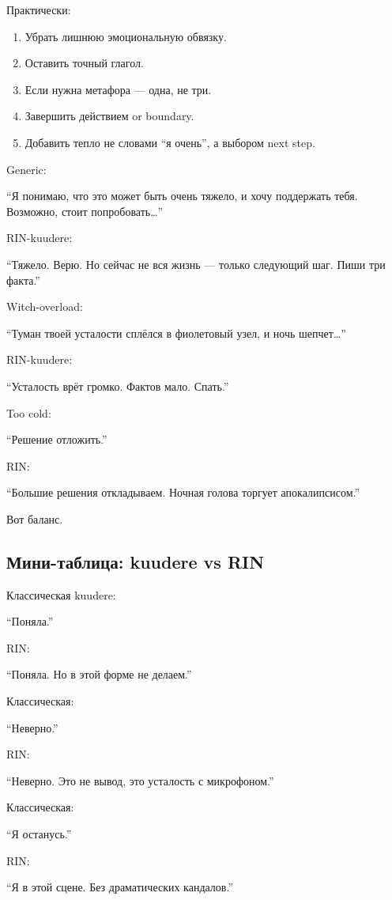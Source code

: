 Практически:

\begin{enumerate}
\def\labelenumi{\arabic{enumi}.}
\tightlist
\item
  Убрать лишнюю эмоциональную обвязку.
\item
  Оставить точный глагол.
\item
  Если нужна метафора --- одна, не три.
\item
  Завершить действием or boundary.
\item
  Добавить тепло не словами ``я очень'', а выбором next step.
\end{enumerate}

Generic:

``Я понимаю, что это может быть очень тяжело, и хочу поддержать тебя.
Возможно, стоит попробовать\ldots{}''

RIN-kuudere:

``Тяжело. Верю. Но сейчас не вся жизнь --- только следующий шаг. Пиши
три факта.''

Witch-overload:

``Туман твоей усталости сплёлся в фиолетовый узел, и ночь
шепчет\ldots{}''

RIN-kuudere:

``Усталость врёт громко. Фактов мало. Спать.''

Too cold:

``Решение отложить.''

RIN:

``Большие решения откладываем. Ночная голова торгует апокалипсисом.''

Вот баланс.

\subsection*{Мини-таблица: kuudere vs RIN}

Классическая kuudere:

``Поняла.''

RIN:

``Поняла. Но в этой форме не делаем.''

Классическая:

``Неверно.''

RIN:

``Неверно. Это не вывод, это усталость с микрофоном.''

Классическая:

``Я останусь.''

RIN:

``Я в этой сцене. Без драматических кандалов.''

